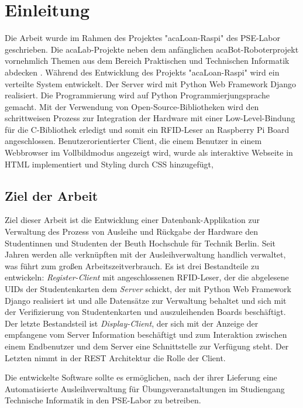\chapter{Einleitung}
\label{sec:intro}
Die Arbeit wurde im Rahmen des Projektes "acaLoan-Raspi" \cite{website:17} des PSE-Labor geschrieben. Die acaLab-Projekte neben dem anfänglichen acaBot-Roboterprojekt vornehmlich Themen aus dem Bereich Praktischen und Technischen Informatik abdecken \cite{website:1}. Während des Entwicklung des Projekts  "acaLoan-Raspi" wird ein verteilte System entwickelt. Der Server wird mit Python Web Framework Django realisiert. Die Programmierung wird auf Python Programmierjungsprache gemacht. Mit der Verwendung von Open-Source-Bibliotheken wird den schrittweisen Prozess zur Integration der Hardware mit einer Low-Level-Bindung für die C-Bibliothek erledigt und somit ein RFID-Leser an Raspberry Pi Board angeschlossen. Benutzerorientierter Client, die einem Benutzer in einem Webbrowser im Vollbildmodus angezeigt wird, wurde als interaktive Webseite in HTML implementiert und Styling durch CSS hinzugefügt, 


\section{Ziel der Arbeit}
\label{sec:intro:goal}
Ziel dieser Arbeit ist die Entwicklung einer Datenbank-Applikation zur Verwaltung des Prozess von Ausleihe und Rückgabe der Hardware den Studentinnen und Studenten der Beuth Hochschule für Technik Berlin. Seit Jahren werden alle verknüpften mit der Ausleihverwaltung handlich verwaltet, was führt zum großen Arbeitszeitverbrauch. Es ist drei Bestandteile zu entwickeln: \textit{Register-Client} mit angeschlossenen RFID-Leser, der die abgelesene UIDs der Studentenkarten dem \textit{Server} schickt, der mit Python Web Framework Django realisiert ist und alle Datensätze zur Verwaltung behaltet und sich mit der Verifizierung von Studentenkarten und auszuleihenden Boards beschäftigt. Der letzte Bestandsteil ist \textit{Display-Client}, der sich mit der Anzeige der empfangene vom Server Information beschäftigt und zum Interaktion zwischen einem Endbenutzer und dem Server eine Schnittstelle zur Verfügung steht. Der Letzten nimmt in der REST Architektur die Rolle der Client. 

Die entwickelte Software sollte es ermöglichen, nach der ihrer Lieferung eine Automatisierte Ausleihverwaltung für Übungsveranstaltungen im Studiengang Technische Informatik in den PSE-Labor zu betreiben. 

